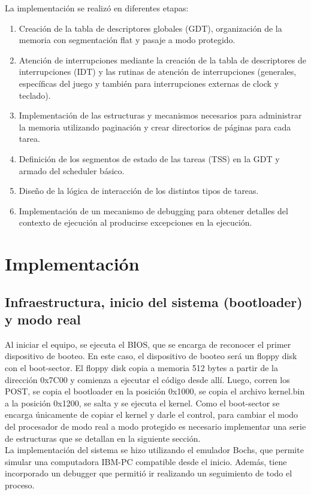 \documentclass[a4paper]{article}
\begin{document}
La implementación se realizó en diferentes etapas:
\begin{enumerate}
\item Creación de la tabla de descriptores globales (GDT), organización de la memoria con segmentación flat y pasaje a modo protegido.
\item Atención de interrupciones mediante la creación de la tabla de descriptores de interrupciones (IDT) y las rutinas de atención de interrupciones (generales, específicas del juego y también para interrupciones externas de clock y teclado).
\item Implementación de las estructuras y mecanismos necesarios para administrar la memoria utilizando paginación y crear directorios de páginas para cada tarea.
\item Definición de los segmentos de estado de las tareas (TSS) en la GDT y armado del scheduler básico.
\item Diseño de la lógica de interacción de los distintos tipos de tareas.
\item Implementación de un mecanismo de debugging para obtener detalles del contexto de ejecución al producirse excepciones en la ejecución.
\end{enumerate}

\section{Implementación}

\subsection{Infraestructura, inicio del sistema (bootloader) y modo real}

Al iniciar el equipo, se ejecuta el BIOS, que se encarga de reconocer el primer dispositivo de booteo. En este caso, el dispositivo de booteo será un floppy disk con el boot-sector. El floppy disk copia a memoria 512 bytes a partir de la dirección 0x7C00 y comienza a ejecutar el código desde allí. Luego, corren los POST, se copia el bootloader en la posición 0x1000, se copia el archivo kernel.bin a la posición 0x1200, se salta y se ejecuta el kernel. Como el boot-sector se encarga únicamente de copiar el kernel y darle el control, para cambiar el modo del procesador de modo real a modo protegido es necesario implementar una serie de estructuras que se detallan en la siguiente sección. \\
La implementación del sistema se hizo utilizando el emulador Bochs, que permite simular una computadora IBM-PC compatible desde el inicio. Además, tiene incorporado un debugger que permitió ir realizando un seguimiento de todo el proceso.
\end{document}
